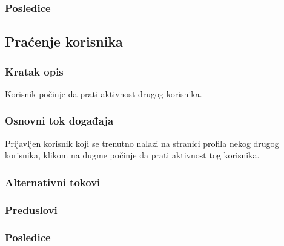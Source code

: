 \subsubsection{Posledice}




\subsection{Praćenje korisnika}
\label{subsec:pracenje-korisnika}

\subsubsection{Kratak opis}
Korisnik počinje da prati aktivnost drugog korisnika.
\subsubsection{Osnovni tok događaja}
Prijavljen korisnik koji se trenutno nalazi na stranici profila nekog drugog korisnika, klikom na dugme  počinje da prati aktivnost tog korisnika.
\subsubsection{Alternativni tokovi}

\subsubsection{Preduslovi}

\subsubsection{Posledice}
